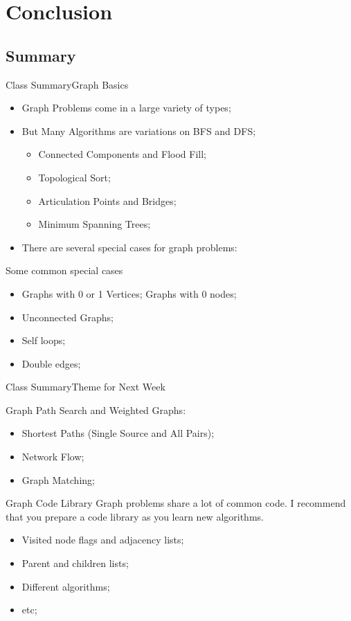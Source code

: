 
\section{Conclusion}
\subsection{Summary}
\begin{frame}{Class Summary}{Graph Basics}
  \begin{itemize}
    \item Graph Problems come in a large variety of types;
    \item But Many Algorithms are variations on BFS and DFS;
    \begin{itemize}
      \item Connected Components and Flood Fill;
      \item Topological Sort;
      \item Articulation Points and Bridges;
      \item Minimum Spanning Trees;
    \end{itemize}
    \item There are several special cases for graph problems:
  \end{itemize}

  \begin{block}{Some common special cases}
    \begin{itemize}
    \item Graphs with 0 or 1 Vertices; Graphs with 0 nodes;
    \item Unconnected Graphs;
    \item Self loops;
    \item Double edges;
    \end{itemize}
  \end{block}
\end{frame}

\begin{frame}{Class Summary}{Theme for Next Week}

  Graph Path Search and Weighted Graphs:
  \begin{itemize}
    \item Shortest Paths (Single Source and All Pairs);
    \item Network Flow;
    \item Graph Matching;
  \end{itemize}\bigskip

  \begin{block}{Graph Code Library}
    Graph problems share a lot of common code. I recommend that you prepare a code library as you learn new algorithms.
    \bigskip
    \begin{itemize}
    \item Visited node flags and adjacency lists;
    \item Parent and children lists;
    \item Different algorithms;
    \item etc;
    \end{itemize}
  \end{block}
\end{frame}

